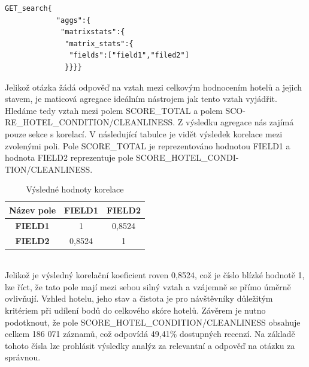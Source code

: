 \documentclass[czech,BP]{thesiskiv}
\begin{document}
\begin{lstlisting}[title={Zápis matrix\_stats}]
	       GET_search{
	        "aggs":{
	         "matrixstats":{
	          "matrix_stats":{
	           "fields":["field1","filed2"]
	          }}}}
\end{lstlisting}
\noindent
Jelikož otázka žádá odpověď na vztah mezi celkovým hodnocením hotelů a jejich stavem, je maticová agregace ideálním nástrojem jak tento vztah vyjádřit. Hledáme tedy vztah mezi polem SCORE\_TOTAL  a polem SCO- RE\_HOTEL\_CONDITION/CLEANLINESS. Z výsledku agregace nás zajímá pouze sekce s korelací. V následující tabulce je vidět výsledek korelace mezi zvolenými poli. Pole SCORE\_TOTAL je reprezentováno hodnotou FIELD1 a hodnota FIELD2 reprezentuje pole SCORE\_HOTEL\_CONDI- TION/CLEANLINESS.
\begin{table}[h]
	\centering
	
	\begin{tabular}{|c|c|c|}
		\hline
		\multicolumn{1}{|l|}{\textbf{Název pole}} & \multicolumn{1}{l|}{\textbf{FIELD1}} & \multicolumn{1}{l|}{\textbf{FIELD2}} \\ \hline
		\textbf{FIELD1} & 1 & 0,8524 \\ \hline
		\textbf{FIELD2} & 0,8524 & 1 \\ \hline
	\end{tabular}
\caption{Výsledné hodnoty korelace}
\label{my-label}
\end{table}
\mbox{}\\
Jelikož je výsledný korelační koeficient roven 0,8524, což je číslo blízké hodnotě 1, lze říct, že tato pole mají mezi sebou silný vztah a vzájemně se přímo úměrně ovlivňují. Vzhled hotelu, jeho stav a čistota je pro návštěvníky důležitým kritériem při udílení bodů do celkového skóre hotelů. Závěrem je nutno podotknout, že pole SCORE\_HOTEL\_CONDITION/CLEANLINESS obsahuje celkem 186 071 záznamů, což odpovídá 49,41\% dostupných recenzí. Na základě tohoto čísla lze prohlásit výsledky analýz za relevantní a odpověď na otázku za správnou.
\end{document}
